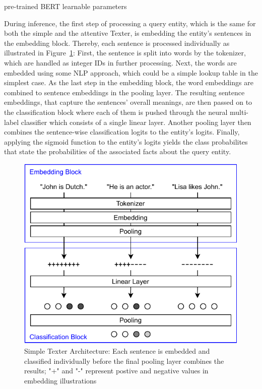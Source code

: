 pre-trained BERT
learnable parameters

During inference, the first step of processing a query entity, which is the same for both the simple and the attentive Texter, is embedding the entity's sentences in the embedding block. Thereby, each sentence is processed individually as illustrated in Figure~\ref{fig:4_approach/1_texter/1_simple_model/simple_architecture}: First, the sentence is split into words by the tokenizer, which are handled as integer IDs in further processing. Next, the words are embedded using some NLP approach, which could be a simple lookup table in the simplest case. As the last step in the embedding block, the word embeddings are combined to sentence embeddings in the pooling layer. The resulting sentence embeddings, that capture the sentences' overall meanings, are then passed on to the classification block where each of them is pushed through the neural multi-label classifier which consists of a single linear layer. Another pooling layer then combines the sentence-wise classification logits to the entity's logits. Finally, applying the sigmoid function to the entity's logits yields the class probabilites that state the probabilities of the associated facts about the query entity.

\begin{figure}[t]
    \centering
    \includegraphics{4_approach/1_texter/1_simple_model/simple_architecture}
    \caption{Simple Texter Architecture: Each sentence is embedded and classified individually before the final pooling layer combines the results; "+" and "-" represent postive and negative values in embedding illustrations}
    \label{fig:4_approach/1_texter/1_simple_model/simple_architecture}
\end{figure}

